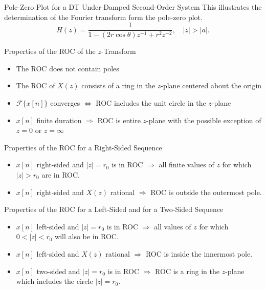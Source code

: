\begin{frame}{Pole-Zero Plot for a DT Under-Damped Second-Order System}
    This illustrates the determination of the Fourier transform form the pole-zero plot.
    \begin{equation*}
        H(z) = \frac{1}{1-(2r\cos\theta)z^{-1} + r^2z^{-2}}, \quad |z| >|a|.
    \end{equation*}
    {
        \begin{center}
            
        \end{center}
    }
\end{frame}




\begin{frame}{Properties of the ROC of the $z$-Transform}
    \begin{itemize}
      \item The ROC does not contain poles
      \item The ROC of $X(z)$ consists of a ring in the $z$-plane centered about the origin
      \item $\mathcal{F}\{x[n]\}$ converges $\Leftrightarrow$ ROC includes the unit circle in the $z$-plane
      \item $x[n]$ finite duration $\Rightarrow$ ROC is entire $z$-plane with the possible exception of $z = 0$ or $z = \infty$
    \end{itemize}
\end{frame}

\begin{frame}{Properties of the ROC for a Right-Sided Sequence}
    \begin{itemize}
      \item $x[n]$ right-sided and $|z| = r_0$ is in ROC $\Rightarrow$ all finite values of $z$ for which $|z| > r_0$ are in ROC.
      \item $x[n]$ right-sided and $X(z)$ rational $\Rightarrow$ ROC is outside the outermost pole.
    \end{itemize}
\end{frame}

\begin{frame}{Properties of the ROC for a Left-Sided and for a Two-Sided Sequence}
    \begin{itemize}
      \item $x[n]$ left-sided and $|z| = r_0$ is in ROC $\Rightarrow$ all  values of $z$ for which $0 < |z| < r_0$ will also be in ROC.
      \item $x[n]$ left-sided and $X(z)$ rational $\Rightarrow$ ROC is inside  the innermost pole.
      \item $x[n]$ two-sided and $|z| = r_0$ is in ROC $\Rightarrow$ ROC is a ring in the  $z$-plane which includes the circle $|z|= r_0$.
    \end{itemize}
\end{frame}

